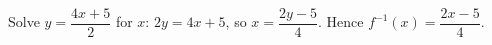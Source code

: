 Solve \(y=\dfrac{4x+5}{2}\) for \(x\): \(2y=4x+5\), so \(x=\dfrac{2y-5}{4}\). Hence \(\boxed{f^{-1}(x)=\dfrac{2x-5}{4}}\).
